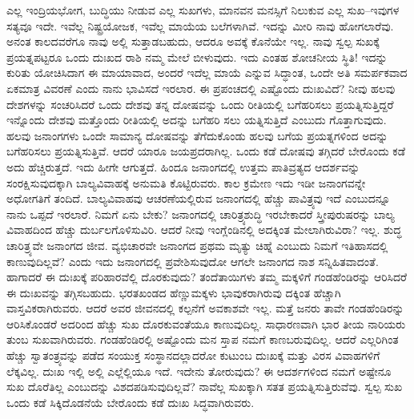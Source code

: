 ಎಲ್ಲ ಇಂದ್ರಿಯಭೋಗ, ಬುದ್ಧಿಯು ನೀಡುವ ಎಲ್ಲ ಸುಖಗಳು, ಮಾನವನ ಮನಸ್ಸಿಗೆ ನಿಲುಕುವ ಎಲ್ಲ ಸುಖ–ಇವುಗಳ ಸತ್ಯವೂ ಇದೇ. ಇವೆಲ್ಲ ನಿಷ್ಟ್ರಯೋಜಕ, ಇವೆಲ್ಲ ಮಾಯೆಯ ಬಲೆಗಳಾಗಿವೆ. ಇದನ್ನು ಮೀರಿ ನಾವು ಹೋಗಲಾರೆವು. ಅನಂತ ಕಾಲದವರೆಗೂ ನಾವು ಅಲ್ಲಿ ಸುತ್ತಾಡಬಹುದು, ಆದರೂ ಅವಕ್ಕೆ ಕೊನೆಯೇ ಇಲ್ಲ. ನಾವು ಸ್ವಲ್ಪ ಸುಖಕ್ಕೆ ಪ್ರಯತ್ನಪಟ್ಟರೂ ಒಂದು ದುಃಖದ ರಾಶಿ ನಮ್ಮ ಮೇಲೆ ಬೀಳುವುದು. ಇದು ಎಂತಹ ಶೋಚನೀಯ ಸ್ಥಿತಿ! ಇದನ್ನು ಕುರಿತು ಯೋಚಿಸಿದಾಗ ಈ ಮಾಯಾವಾದ, ಅಂದರೆ ಇದೆಲ್ಲ ಮಾಯೆ ಎನ್ನುವ ಸಿದ್ಧಾಂತ, ಒಂದೇ ಅತಿ ಸಮರ್ಪಕವಾದ ಏಕಮಾತ್ರ ವಿವರಣೆ ಎಂದು ನಾನು ಭಾವಿಸದೆ ಇರಲಾರ. ಈ ಪ್ರಪಂಚದಲ್ಲಿ ಎಷ್ಟೊಂದು ದುಃಖವಿದೆ? ನೀವು ಹಲವು ದೇಶಗಳನ್ನು ಸಂಚರಿಸಿದರೆ ಒಂದು ದೇಶವು ತನ್ನ ದೋಷವನ್ನು ಒಂದು ರೀತಿಯಲ್ಲಿ ಬಗೆಹರಿಸಲು ಪ್ರಯತ್ನಿಸುತ್ತಿದ್ದರೆ ಇನ್ನೊಂದು ದೇಶವು ಮತ್ತೊಂದು ರೀತಿಯಲ್ಲಿ ಅದನ್ನು ಬಗೆಹರಿ ಸಲು ಯತ್ನಿಸುತ್ತಿದೆ ಎಂಬುದು ಗೊತ್ತಾಗುವುದು. ಹಲವು ಜನಾಂಗಗಳು ಒಂದೇ ಸಾಮಾನ್ಯ ದೋಷವನ್ನು ತೆಗೆದುಕೊಂಡು ಹಲವು ಬಗೆಯ ಪ್ರಯತ್ನಗಳಿಂದ ಅದನ್ನು ಬಗೆಹರಿಸಲು ಪ್ರಯತ್ನಿಸುತ್ತಿವೆ. ಆದರೆ ಯಾರೂ ಜಯಪ್ರದರಾಗಿಲ್ಲ. ಒಂದು ಕಡೆ ದೋಷವು ತಗ್ಗಿದರೆ ಬೇರೊಂದು ಕಡೆ ಅದು ಹೆಚ್ಚಿರುತ್ತದೆ. ಇದು ಹೀಗೇ ಆಗುತ್ತದೆ. ಹಿಂದೂ ಜನಾಂಗದಲ್ಲಿ ಉತ್ತಮ ಪಾತಿವ್ರತ್ಯದ ಆದರ್ಶವನ್ನು ಸಂರಕ್ಷಿಸುವುದಕ್ಕಾಗಿ ಬಾಲ್ಯವಿವಾಹಕ್ಕೆ ಅನುಮತಿ ಕೊಟ್ಟಿರುವರು. ಕಾಲ ಕ್ರಮೇಣ ಇದು ಇಡೀ ಜನಾಂಗವನ್ನೇ ಅಧೋಗತಿಗೆ ತಂದಿದೆ. ಬಾಲ್ಯವಿವಾಹವು ಆಚರಣೆಯಲ್ಲಿರುವ ಜನಾಂಗದಲ್ಲಿ ಹೆಚ್ಚು ಪಾವಿತ್ರ್ಯವು ಇದೆ ಎಂಬುದನ್ನೂ ನಾನು ಒಪ್ಪದೆ ಇರಲಾರೆ. ನಿಮಗೆ ಏನು ಬೇಕು? ಜನಾಂಗದಲ್ಲಿ ಚಾರಿತ್ರ್ಯಶುದ್ಧಿ ಇರಬೇಕಾದರೆ ಸ್ತ್ರೀಪುರುಷರನ್ನು ಬಾಲ್ಯ ವಿವಾಹದಿಂದ ಹೆಚ್ಚು ದುರ್ಬಲಗೊಳಿಸುವಿರಿ. ಆದರೆ ನೀವು ಇಂಗ್ಲೆಂಡಿನಲ್ಲಿ ಅದಕ್ಕಿಂತ ಮೇಲಾಗಿರುವಿರಾ? ಇಲ್ಲ. ಶುದ್ಧ ಚಾರಿತ್ರ್ಯವೇ ಜನಾಂಗದ ಜೀವ. ವ್ಯಭಿಚಾರವೇ ಜನಾಂಗದ ಪ್ರಥಮ ಮೃತ್ಯು ಚಿಹ್ನೆ ಎಂಬುದು ನಿಮಗೆ ಇತಿಹಾಸದಲ್ಲಿ ಕಾಣುವುದಿಲ್ಲವೆ? ಎಂದು ಇದು ಜನಾಂಗದಲ್ಲಿ ಪ್ರವೇಶಿಸುವುದೋ ಆಗಲೇ ಜನಾಂಗದ ನಾಶ ಸನ್ನಿಹಿತವಾದಂತೆ. ಹಾಗಾದರೆ ಈ ದುಃಖಕ್ಕೆ ಪರಿಹಾರವೆಲ್ಲಿ ದೊರಕುವುದು? ತಂದೆತಾಯಿಗಳು ತಮ್ಮ ಮಕ್ಕಳಿಗೆ ಗಂಡಹೆಂಡಿರನ್ನು ಆರಿಸಿದರೆ ಈ ದುಃಖವನ್ನು ತಗ್ಗಿಸಬಹುದು. ಭರತಖಂಡದ ಹೆಣ್ಣುಮಕ್ಕಳು ಭಾವುಕರಾಗಿರುವು ದಕ್ಕಿಂತ ಹೆಚ್ಚಾಗಿ ವಾಸ್ತವಿಕರಾಗಿರುವರು. ಆದರೆ ಅವರ ಜೀವನದಲ್ಲಿ ಕಲ್ಪನೆಗೆ ಅವಕಾಶವೇ ಇಲ್ಲ. ಮತ್ತೆ ಜನರು ತಾವೇ ಗಂಡಹೆಂಡಿರನ್ನು ಆರಿಸಿಕೊಂಡರೆ ಅದರಿಂದ ಹೆಚ್ಚು ಸುಖ ದೊರಕುವಂತೆಯೂ ಕಾಣುವುದಿಲ್ಲ. ಸಾಧಾರಣವಾಗಿ ಭಾರ ತೀಯ ನಾರಿಯರು ತುಂಬ ಸುಖವಾಗಿರುವರು. ಗಂಡಹೆಂಡಿರಲ್ಲಿ ಅಷ್ಟೊಂದು ಮನ ಸ್ತಾಪ ನಮಗೆ ಕಾಣಬರುವುದಿಲ್ಲ. ಆದರೆ ಎಲ್ಲರಿಗಿಂತ ಹೆಚ್ಚು ಸ್ವಾತಂತ್ರ್ಯವನ್ನು ಪಡೆದ ಸಂಯುಕ್ತ ಸಂಸ್ಥಾನದಲ್ಲಾದರೋ ಕುಟುಂಬ ದುಃಖಕ್ಕೆ ಮತ್ತು ವಿರಸ ವಿವಾಹಗಳಿಗೆ ಲೆಕ್ಕವಿಲ್ಲ. ದುಃಖ ಇಲ್ಲಿ ಅಲ್ಲಿ ಎಲ್ಲೆಲ್ಲಿಯೂ ಇದೆ. ಇದೇನು ತೋರುವುದು? ಈ ಆದರ್ಶಗಳಿಂದ ನಮಗೆ ಅಷ್ಟೇನೂ ಸುಖ ದೊರೆತಿಲ್ಲ ಎಂಬುದನ್ನು ವಿಶದಪಡಿಸುವುದಿಲ್ಲವೆ? ನಾವೆಲ್ಲ ಸುಖಕ್ಕಾಗಿ ಸತತ ಪ್ರಯತ್ನಿಸುತ್ತಿರುವೆವು. ಸ್ವಲ್ಪ ಸುಖ ಒಂದು ಕಡೆ ಸಿಕ್ಕಿದೊಡನೆಯೆ ಬೇರೊಂದು ಕಡೆ ದುಃಖ ಸಿದ್ಧವಾಗಿರುವರು.

